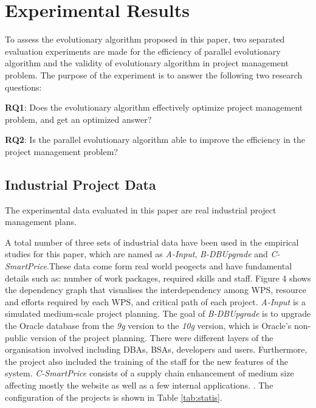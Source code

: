%
%

\section{Experimental Results}
%
To assess the evolutionary algorithm proposed in this paper, two separated
evaluation experiments are made for the efficiency of parallel evolutionary
algorithm and the validity of evolutionary algorithm in project management
problem. The purpose of the experiment is to answer the following two research
questions:


\textbf{RQ1}: Does the evolutionary algorithm effectively optimize project
management problem, and get an optimized answer?

\textbf{RQ2}: Is the parallel evolutionary algorithm able to improve the
efficiency in the project management problem?


\subsection{Industrial Project Data}
%
The experimental data evaluated in this paper are real industrial project
management plans.


A total number of three sets of industrial data have been used in the empirical
studies for this paper, which are named as \emph{A-Input},
\emph{B-DBUpgrade} and \emph{C-SmartPrice}.These data come form real world 
peogects and have fundamental details such as: number of work packages, required skills and staff. 
Figure 4 shows the dependency graph that visualises the interdependency among WPS,
resource and efforts required by each WPS, and critical path of each project.
\emph{A-Input} is a simulated medium-scale project planning. 
The goal of \emph{B-DBUpgrade} is to upgrade the Oracle
database from the \emph{9g} version to the \emph{10g} version, which is Oracle's
non-public version of the project planning. There were different layers of the 
organisation involved including DBAs, BSAs, developers and users.
Furthermore, the project also included the training of the staff
for the new features of the system. \emph{C-SmartPrice} consists of a supply chain enhancement of medium size
affecting mostly the website as well as a few internal applications. \cite{ren}. 
The configuration of the projects is shown in Table \ref{tab:statis}.

